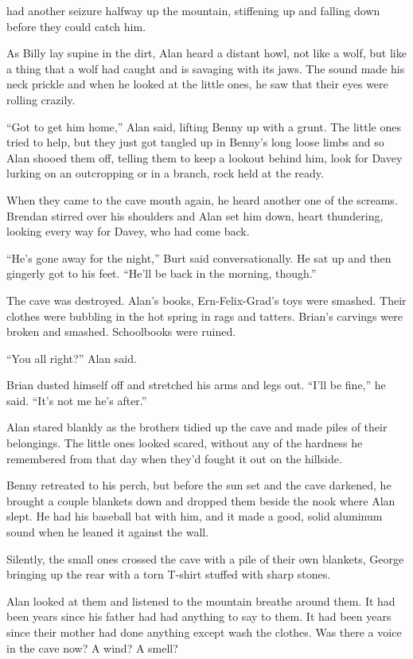  had another seizure halfway up the mountain, stiffening up and
falling down before they could catch him.

As Billy lay supine in the dirt, Alan heard a distant howl, not like a
wolf, but like a thing that a wolf had caught and is savaging with its
jaws.  The sound made his neck prickle and when he looked at the
little ones, he saw that their eyes were rolling crazily.

``Got to get him home,'' Alan said, lifting Benny up with a grunt. 
The little ones tried to help, but they just got tangled up in Benny's
long loose limbs and so Alan shooed them off, telling them to keep a
lookout behind him, look for Davey lurking on an outcropping or in a
branch, rock held at the ready.

When they came to the cave mouth again, he heard another one of the
screams.  Brendan stirred over his shoulders and Alan set him down,
heart thundering, looking every way for Davey, who had come back.

``He's gone away for the night,'' Burt said conversationally.  He sat
up and then gingerly got to his feet.  ``He'll be back in the morning,
though.''

The cave was destroyed.  Alan's books, Ern-Felix-Grad's toys were
smashed.  Their clothes were bubbling in the hot spring in rags and
tatters.  Brian's carvings were broken and smashed.  Schoolbooks were
ruined.

``You all right?'' Alan said.

Brian dusted himself off and stretched his arms and legs out.  ``I'll
be fine,'' he said.  ``It's not me he's after.''

Alan stared blankly as the brothers tidied up the cave and made piles
of their belongings.  The little ones looked scared, without any of
the hardness he remembered from that day when they'd fought it out on
the hillside.

Benny retreated to his perch, but before the sun set and the cave
darkened, he brought a couple blankets down and dropped them beside
the nook where Alan slept.  He had his baseball bat with him, and it
made a good, solid aluminum sound when he leaned it against the wall.

Silently, the small ones crossed the cave with a pile of their own
blankets, George bringing up the rear with a torn T-shirt stuffed with
sharp stones.

Alan looked at them and listened to the mountain breathe around them. 
It had been years since his father had had anything to say to them. 
It had been years since their mother had done anything except wash the
clothes.  Was there a voice in the cave now?  A wind?  A smell?

